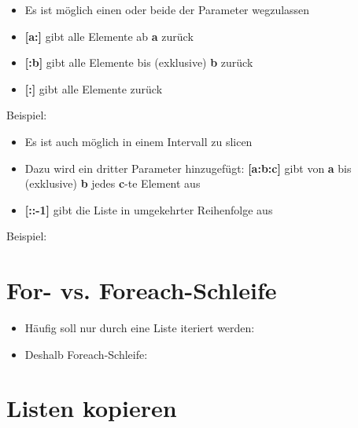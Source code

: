 \begin{frame}
	\slidehead
	\begin{itemize}
		\item Es ist möglich einen oder beide der Parameter wegzulassen
		\pause
		\item \textbf{[a:]} gibt alle Elemente ab \textbf{a} zurück
		\pause
		\item \textbf{[:b]} gibt alle Elemente bis (exklusive) \textbf{b} zurück
		\pause
		\item \textbf{[:]} gibt alle Elemente zurück
	\end{itemize}
	\pause
	\begin{block}{Beispiel:}
	\end{block}
\end{frame}

\begin{frame}
	\slidehead
	\begin{itemize}
		\item Es ist auch möglich in einem Intervall zu slicen
		\pause
		\item Dazu wird ein dritter Parameter hinzugefügt: \textbf{[a:b:c]} gibt von \textbf{a} bis (exklusive) \textbf{b} jedes \textbf{c}-te Element aus
		\pause
		\item \textbf{[::-1]} gibt die Liste in umgekehrter Reihenfolge aus
	\end{itemize}
	\pause
	\begin{block}{Beispiel:}
	\end{block}
\end{frame}

\livecoding

\section{For- vs. Foreach-Schleife}
\begin{frame}
	\slidehead

	\begin{itemize}
		\item Häufig soll nur durch eine Liste iteriert werden:
		\pause

		\item Deshalb Foreach-Schleife:
	\end{itemize}
\end{frame}

\section{Listen kopieren}
\begin{frame}
	\slidehead
\end{frame}


